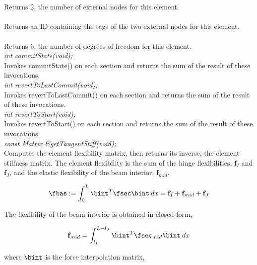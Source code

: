   \\
 \\
Returns 2, the number of external nodes for this element. \\

 \\
Returns an ID containing the tags of the two external nodes for this element. \\

\\
Returns 6, the number of degrees of freedom for this element. \\ 

{\em int commitState(void);} \\
Invokes commitState() on each section and returns the sum of the result of
these invocations. \\

{\em int revertToLastCommit(void);} \\
Invokes revertToLastCommit() on each section and returns the sum of the result of
these invocations. \\

{\em int revertToStart(void);} \\
Invokes revertToStart() on each section and returns the sum of the result of
these invocations. \\

{\em const Matrix \&getTangentStiff(void);} \\
Computes the element flexibility matrix, then returns its inverse, the element
stiffness matrix. The element flexibility is the sum of the hinge flexibilities,
$\mathbf{f}_I$ and $\mathbf{f}_J$, and the elastic flexibility of the beam interior,
$\mathbf{f}_{mid}$.

\begin{equation}
\label{eq:fele}
\fbas := \int_{0}^{L}{\bint^T \fsec \bint \: dx} = \mathbf{f}_I + \mathbf{f}_{mid} + \mathbf{f}_J
\end{equation}

The flexibility of the beam interior is obtained in closed form,

\begin{equation}
\mathbf{f}_{mid} = \int_{l_I}^{L-l_J}{\bint^T \fsec_{mid} \bint \: dx}
\end{equation}

where $\bint$ is the force interpolation matrix,

